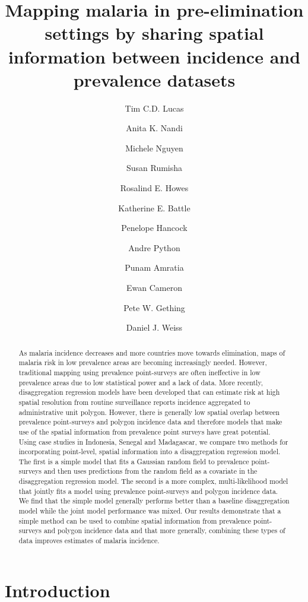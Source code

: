 \documentclass{statsoc}
\title[Mapping malaria by sharing spatial information]{Mapping malaria in pre-elimination settings by sharing spatial information between incidence and prevalence datasets}
\author[Tim C.D. Lucas {\it et al.}]{Tim C.D. Lucas}
\author{Anita K. Nandi}
\author{Michele Nguyen}
\author{Susan Rumisha}
\author{Rosalind E. Howes}
\author{Katherine E. Battle}
\author{Penelope Hancock}
\author{Andre Python}
\author{Punam Amratia}
\author{Ewan Cameron}
\author{Pete W. Gething}
\author{Daniel J. Weiss}
\begin{document}
\begin{abstract}
As malaria incidence decreases and more countries move towards elimination, maps of malaria risk in low prevalence areas are becoming increasingly needed.
However, traditional mapping using prevalence point-surveys are often ineffective in low prevalence areas due to low statistical power and a lack of data.
More recently, disaggregation regression models have been developed that can estimate risk at high spatial resolution from routine surveillance reports incidence aggregated to administrative unit polygon.
However, there is generally low spatial overlap between prevalence point-surveys and polygon incidence data and therefore models that make use of the spatial information from prevalence point surveys have great potential.
Using case studies in Indonesia, Senegal and Madagascar, we compare two methods for incorporating point-level, spatial information into a disaggregation regression model.
The first is a simple model that fits a Gaussian random field to prevalence point-surveys and then uses predictions from the random field as a covariate in the disaggregation regression model.
The second is a more complex, multi-likelihood model that jointly fits a model using prevalence point-surveys and  polygon incidence data.
We find that the simple model generally performs better than a baseline disaggregation model while the joint model performance was mixed.
Our results demonstrate that a simple method can be used to combine spatial information from prevalence point-surveys and polygon incidence data and that more generally, combining these types of data improves estimates of malaria incidence.
\end{abstract}



\section*{Introduction}


\end{document}
